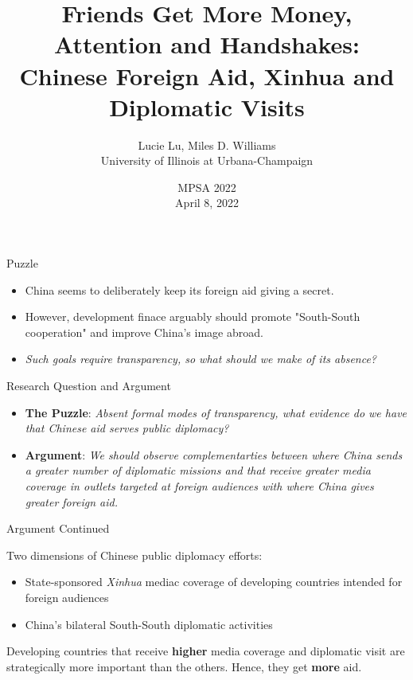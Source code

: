 \documentclass{beamer}
\title{Friends Get More Money, Attention and Handshakes:
Chinese Foreign Aid, Xinhua and Diplomatic Visits}
\author{Lucie Lu, Miles D. Williams\\ University of Illinois at Urbana-Champaign}
\date {MPSA 2022 \\ April 8, 2022}
\begin{document}
\maketitle

\begin{frame}{Puzzle}

\begin{itemize}
    \item China seems to deliberately keep its foreign aid giving a secret.
    \item However, development finace arguably should promote "South-South cooperation" and improve China's image abroad.
    \item \textit{Such goals require transparency, so what should we make of its absence?}
\end{itemize}


    
\end{frame}

\begin{frame}{Research Question and Argument}

\begin{itemize}
\item \textbf{The Puzzle}: \textit{Absent formal modes of transparency, what evidence do we have that Chinese aid serves public diplomacy?}
\item \textbf{Argument}: \textit{We should observe complementarties between where China sends a greater number of diplomatic missions and that receive greater media coverage in outlets targeted at foreign audiences with where China gives greater foreign aid.}
\end{itemize}

\end{frame}


\begin{frame}{Argument Continued}

Two dimensions of Chinese public diplomacy efforts:

\begin{itemize}
    \item State-sponsored \textit{Xinhua} mediac coverage of developing countries intended for foreign audiences
    \item China’s bilateral South-South diplomatic activities

\end{itemize}


Developing countries that receive \textbf{higher} media coverage and diplomatic visit are strategically more important than the others. Hence, they get \textbf{more} aid.
    

\end{frame}
\end{document}
